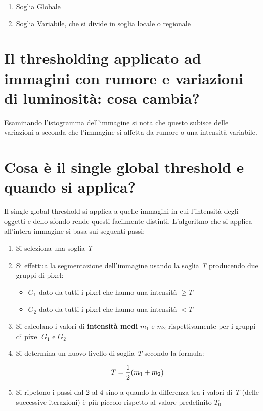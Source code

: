 \begin{enumerate}
\item Soglia Globale
\item Soglia Variabile, che si divide in soglia locale o regionale
\end{enumerate}

\section{Il thresholding applicato ad immagini con rumore e variazioni di luminosità: cosa cambia?}
Esaminando l'istogramma dell'immagine si nota che questo subisce delle variazioni a seconda che 
l'immagine si affetta da rumore o una intensità variabile.

\section{Cosa è il single global threshold e quando si applica?}
Il single global threshold si applica a quelle immagini in cui l'intensità degli oggetti e dello sfondo rende questi facilmente distinti. L'algoritmo che si applica all'intera immagine si basa sui seguenti passi:

\begin{enumerate}
\item Si seleziona una soglia \textit{T}
\item Si effettua la segmentazione dell'immagine usando la soglia \textit{T} producendo due gruppi di pixel:

\begin{itemize}
\item $G_1$ dato da tutti i pixel che hanno una intensità $\geq T$
\item $G_2$ dato da tutti i pixel che hanno una intensità $ < T$
\end{itemize}

\item Si calcolano i valori di \textbf{intensità medi} $m_1$ e $m_2$ rispettivamente per i gruppi di pixel $G_1$ e $G_2$
\item Si determina un nuovo livello di soglia \textit{T} secondo la formula:

$$
T = {1 \over 2} (m_1 + m_2)
$$

\item Si ripetono i passi dal 2 al 4 sino a quando la differenza tra i valori di \textit{T} (delle successive iterazioni) è più piccolo rispetto al valore predefinito $T_0$
\end{enumerate}

